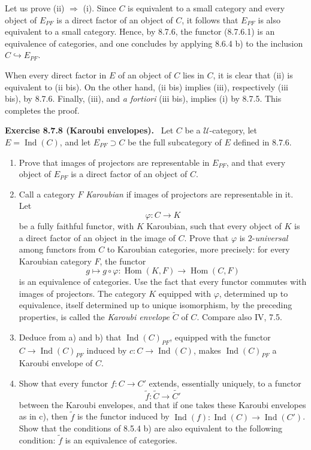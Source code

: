 \documentclass[11pt]{article}
\newcommand{\U}{\mathcal{U}}
\newcommand{\Ind}{\operatorname{Ind}}
\newcommand{\Hhom}{\operatorname{Hom}}
\newcommand{\Kar}[1]{\widetilde{#1}}
\newenvironment{statement}[1]{\par\medskip\noindent\textbf{#1.}\ }{\par\medskip}
\begin{document}
Let us prove (ii) $\Rightarrow$ (i). Since $C$ is equivalent to a small category and every object of $E_{PF}$ is a direct factor of an object of $C$, it follows that $E_{PF}$ is also equivalent to a small category. Hence, by 8.7.6, the functor (8.7.6.1) is an equivalence of categories, and one concludes by applying 8.6.4 b) to the inclusion $C\hookrightarrow E_{PF}$.

When every direct factor in $E$ of an object of $C$ lies in $C$, it is clear that (ii) is equivalent to (ii bis). On the other hand, (ii bis) implies (iii), respectively (iii bis), by 8.7.6. Finally, (iii), and \emph{a fortiori} (iii bis), implies (i) by 8.7.5. This completes the proof.

\begin{statement}{Exercise 8.7.8 (Karoubi envelopes)}
Let $C$ be a $\U$-category, let $E=\Ind(C)$, and let $E_{PF}\supset C$ be the full subcategory of $E$ defined in 8.7.6.
\begin{enumerate}[label=\alph*)]
\item Prove that images of projectors are representable in $E_{PF}$, and that every object of $E_{PF}$ is a direct factor of an object of $C$.
\item Call a category $F$ \emph{Karoubian} if images of projectors are representable in it. Let
\[
 \varphi:C\longrightarrow K
\]
be a fully faithful functor, with $K$ Karoubian, such that every object of $K$ is a direct factor of an object in the image of $C$. Prove that $\varphi$ is $2$-\emph{universal} among functors from $C$ to Karoubian categories, more precisely: for every Karoubian category $F$, the functor
\[
 g\longmapsto g\circ\varphi:
 \Hhom(K,F)\longrightarrow \Hhom(C,F)
\]
is an equivalence of categories. Use the fact that every functor commutes with images of projectors. The category $K$ equipped with $\varphi$, determined up to equivalence, itself determined up to unique isomorphism, by the preceding properties, is called the \emph{Karoubi envelope} $\Kar C$ of $C$. Compare also IV, 7.5.
\item Deduce from a) and b) that $\Ind(C)_{PF}$, equipped with the functor $C\to\Ind(C)_{PF}$ induced by $c:C\to\Ind(C)$, makes $\Ind(C)_{PF}$ a Karoubi envelope of $C$.
\item Show that every functor $f:C\to C'$ extends, essentially uniquely, to a functor
\[
 \Kar f:\Kar C\longrightarrow \Kar {C'}
\]
between the Karoubi envelopes, and that if one takes these Karoubi envelopes as in c), then $\Kar f$ is the functor induced by $\Ind(f):\Ind(C)\to\Ind(C')$. Show that the conditions of 8.5.4 b) are also equivalent to the following condition: $\Kar f$ is an equivalence of categories.
\end{enumerate}
\end{statement}
\end{document}
